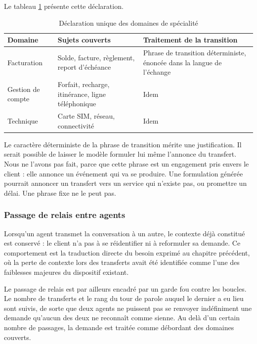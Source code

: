 Le tableau \ref{tab:domaines} présente cette déclaration.

\begin{table}[H]
\centering
\renewcommand{\arraystretch}{1.25}
\begin{tabular}{|p{3.0cm}|p{6.2cm}|p{5.3cm}|}
\hline
\textbf{Domaine} & \textbf{Sujets couverts} & \textbf{Traitement de la transition} \\
\hline
Facturation & Solde, facture, règlement, report d'échéance & Phrase de transition déterministe, énoncée dans la langue de l'échange \\
\hline
Gestion de compte & Forfait, recharge, itinérance, ligne téléphonique & Idem \\
\hline
Technique & Carte SIM, réseau, connectivité & Idem \\
\hline
\end{tabular}
\caption{Déclaration unique des domaines de spécialité}
\label{tab:domaines}
\end{table}

Le caractère déterministe de la phrase de transition mérite une justification. Il serait possible de laisser le modèle formuler lui même l'annonce du transfert. Nous ne l'avons pas fait, parce que cette phrase est un engagement pris envers le client : elle annonce un événement qui va se produire. Une formulation générée pourrait annoncer un transfert vers un service qui n'existe pas, ou promettre un délai. Une phrase fixe ne le peut pas.

\subsubsection{Passage de relais entre agents}

Lorsqu'un agent transmet la conversation à un autre, le contexte déjà constitué est conservé : le client n'a pas à se réidentifier ni à reformuler sa demande. Ce comportement est la traduction directe du besoin exprimé au chapitre précédent, où la perte de contexte lors des transferts avait été identifiée comme l'une des faiblesses majeures du dispositif existant.

Le passage de relais est par ailleurs encadré par un garde fou contre les boucles. Le nombre de transferts et le rang du tour de parole auquel le dernier a eu lieu sont suivis, de sorte que deux agents ne puissent pas se renvoyer indéfiniment une demande qu'aucun des deux ne reconnaît comme sienne. Au delà d'un certain nombre de passages, la demande est traitée comme débordant des domaines couverts.

